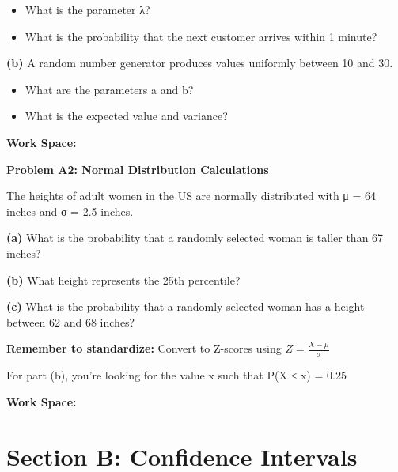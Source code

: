 \documentclass[
  11pt,
]{article}
\providecommand{\tightlist}{%
  \setlength{\itemsep}{0pt}\setlength{\parskip}{0pt}}\usepackage{longtable,booktabs,array}
\begin{document}
\begin{itemize}
\tightlist
\item
  What is the parameter λ?
\item
  What is the probability that the next customer arrives within 1
  minute?
\end{itemize}

\textbf{(b)} A random number generator produces values uniformly between
10 and 30.

\begin{itemize}
\tightlist
\item
  What are the parameters a and b?
\item
  What is the expected value and variance?
\end{itemize}

\textbf{Work Space:}

\textbf{Problem A2: Normal Distribution Calculations}

The heights of adult women in the US are normally distributed with μ =
64 inches and σ = 2.5 inches.

\textbf{(a)} What is the probability that a randomly selected woman is
taller than 67 inches?

\textbf{(b)} What height represents the 25th percentile?

\textbf{(c)} What is the probability that a randomly selected woman has
a height between 62 and 68 inches?

\begin{tcolorbox}[enhanced jigsaw, colback=white, breakable, title=\textcolor{quarto-callout-tip-color}{\faLightbulb}\hspace{0.5em}{Tip}, rightrule=.15mm, titlerule=0mm, opacitybacktitle=0.6, bottomrule=.15mm, colbacktitle=quarto-callout-tip-color!10!white, toptitle=1mm, opacityback=0, left=2mm, leftrule=.75mm, bottomtitle=1mm, toprule=.15mm, colframe=quarto-callout-tip-color-frame, coltitle=black, arc=.35mm]

\textbf{Remember to standardize:} Convert to Z-scores using
\(Z = \frac{X - \mu}{\sigma}\)

For part (b), you're looking for the value x such that P(X ≤ x) = 0.25

\end{tcolorbox}

\textbf{Work Space:}

\section{Section B: Confidence
Intervals}\label{section-b-confidence-intervals}
\end{document}
